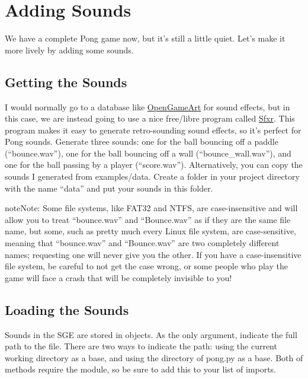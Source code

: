 \documentclass[letterpaper,10pt,english]{sphinxmanual}
\begin{document}
\section{Adding Sounds}
\label{pong_better:adding-sounds}
We have a complete Pong game now, but it's still a little quiet.  Let's
make it more lively by adding some sounds.


\subsection{Getting the Sounds}
\label{pong_better:getting-the-sounds}
I would normally go to a database like \href{http://opengameart.org}{OpenGameArt} for sound effects, but in this case, we are
instead going to use a nice free/libre program called \href{http://www.drpetter.se/project\_sfxr.html}{Sfxr}.  This program makes it
easy to generate retro-sounding sound effects, so it's perfect for Pong
sounds.  Generate three sounds: one for the ball bouncing off a paddle
(``bounce.wav''), one for the ball bouncing off a wall
(``bounce\_wall.wav''), and one for the ball passing by a player
(``score.wav'').  Alternatively, you can copy the sounds I generated from
examples/data.  Create a folder in your project directory with the name
``data'' and put your sounds in this folder.

\begin{notice}{note}{Note:}
Some file systems, like FAT32 and NTFS, are case-insensitive and will
allow you to treat ``bounce.wav'' and ``Bounce.wav'' as if they are the
same file name, but some, such as pretty much every Linux file
system, are case-sensitive, meaning that ``bounce.wav'' and
``Bounce.wav'' are two completely different names; requesting one will
never give you the other.  If you have a case-insensitive file
system, be careful to not get the case wrong, or some people who play
the game will face a crash that will be completely invisible to you!
\end{notice}


\subsection{Loading the Sounds}
\label{pong_better:loading-the-sounds}
Sounds in the SGE are stored in {\hyperref[snd:sge.snd.Sound]{\emph{}}} objects.  As the
only argument, indicate the full path to the file.  There are two ways
to indicate the path: using the current working directory as a base, and
using the directory of pong.py as a base.  Both of methods require the
 module, so be sure to add this to your list of imports.
\end{document}
